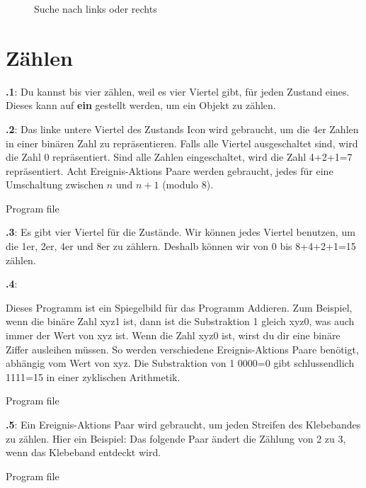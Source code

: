 \documentclass[12pt,a4paper,english]{article}
\begin{document}
\begin{figure}
\begin{center}
\caption{Suche nach links oder rechts}\label{fig.follow1}
\end{center}
\end{figure}

\section{Zählen}

\textbf{\thesection.1}:
Du kannst bis vier zählen, weil es vier Viertel gibt, für jeden Zustand eines. Dieses kann auf  \textbf{ein} gestellt werden, um ein Objekt zu zählen. 

\textbf{\thesection.2}:
Das linke untere Viertel des Zustands Icon wird gebraucht, um die 4er Zahlen in einer binären Zahl zu repräsentieren. Falls alle Viertel ausgeschaltet sind, wird die Zahl 0 repräsentiert. Sind alle Zahlen eingeschaltet, wird die Zahl 4+2+1=7 repräsentiert. Acht Ereignis-Aktions Paare werden gebraucht, jedes für eine Umschaltung zwischen $n$ und $n+1$ (modulo 8).

{\raggedleft \hfill Program file }


\textbf{\thesection.3}:
Es gibt vier Viertel für die Zustände. Wir können jedes Viertel benutzen, um die 1er, 2er, 4er und 8er zu zählern. Deshalb können wir von 0 bis 8+4+2+1=15 zählen.

\textbf{\thesection.4}:

Dieses Programm ist ein Spiegelbild für das Programm Addieren. Zum Beispiel, wenn die binäre Zahl xyz1 ist, dann ist die Substraktion 1 gleich xyz0, was auch immer der Wert von xyz ist. Wenn die Zahl xyz0 ist, wirst du dir eine binäre Ziffer ausleihen müssen. So werden verschiedene Ereignis-Aktions Paare benötigt, abhängig vom Wert von xyz. Die Substraktion von 1 0000=0 gibt schlussendlich 1111=15 in einer zyklischen Arithmetik.


{\raggedleft \hfill Program file }

\textbf{\thesection.5}:
Ein Ereignis-Aktions Paar wird gebraucht, um jeden Streifen des Klebebandes zu zählen. Hier ein Beispiel: Das folgende Paar
ändert die Zählung von 2 zu 3, wenn das Klebeband entdeckt wird.

{\raggedleft \hfill Program file }
\end{document}
